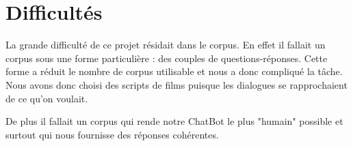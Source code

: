 \section{Difficultés}
La grande difficulté de ce projet résidait dans le corpus. En effet il fallait un corpus sous une forme particulière : des couples de questions-réponses. Cette forme a réduit le nombre de corpus utilisable et nous a donc compliqué la tâche. Nous avons donc choisi des scripts de films puisque les dialogues se rapprochaient de ce qu'on voulait.

De plus il fallait un corpus qui rende notre ChatBot le plus "humain" possible et surtout qui nous fournisse des réponses cohérentes.